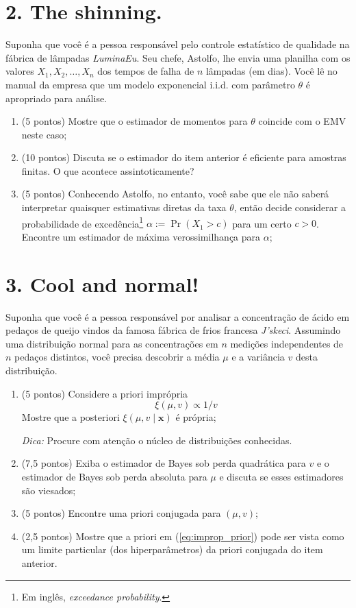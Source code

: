 \documentclass[a4paper,10pt, notitlepage]{report}
\newcommand{\pr}{\operatorname{Pr}} %
\newcommand{\rs}{X_1, X_2, \ldots, X_n} %
\begin{document}
\newpage
\section*{2. The shinning.}

Suponha que você é a pessoa responsável pelo controle estatístico de qualidade na fábrica de lâmpadas \textit{LuminaEu}.
Seu chefe, Astolfo, lhe envia uma planilha com os valores $\rs$ dos tempos de falha de $n$ lâmpadas (em dias).
Você lê no manual da empresa que um modelo exponencial i.i.d. com parâmetro $\theta$ é apropriado para análise.

\begin{enumerate}[label=\alph*)]
 \item (5 pontos) Mostre que o estimador de momentos para $\theta$ coincide com o EMV neste caso;
 \item (10 pontos) Discuta se o estimador do item anterior é eficiente para amostras finitas.
 O que acontece assintoticamente?
 \item (5 pontos) Conhecendo Astolfo, no entanto, você sabe que ele não saberá interpretar quaisquer estimativas diretas da taxa $\theta$, então decide considerar a probabilidade de excedência\footnote{Em inglês, \textit{exceedance probability}.} $\alpha := \pr(X_1 > c)$ para um certo $c > 0$.
 Encontre um estimador de máxima verossimilhança para $\alpha$;
\end{enumerate}

\section*{3. Cool and normal!}

Suponha que você é a pessoa responsável por analisar a concentração de ácido em pedaços de queijo vindos da famosa fábrica de frios francesa \textit{J'skeci}.
Assumindo uma distribuição normal para as concentrações em $n$ medições independentes de $n$ pedaços distintos, você precisa descobrir a média $\mu$ e a variância $v$ desta distribuição.

\begin{enumerate}[label=\alph*)]
 \item (5 pontos) Considere a priori imprópria
 \begin{equation}
 \label{eq:improp_prior}
 \xi(\mu, v) \propto 1/v
 \end{equation}
 Mostre que a posteriori $\xi(\mu, v \mid \boldsymbol{x})$ é própria;
 
 \textit{Dica:} Procure com atenção o núcleo de distribuições conhecidas.
 \item (7,5 pontos) Exiba o estimador de Bayes sob perda quadrática para $v$ e o estimador de Bayes sob perda absoluta para $\mu$ e discuta se esses estimadores são viesados;
 \item (5 pontos) Encontre uma priori  conjugada para $(\mu, v)$;
 \item (2,5 pontos) Mostre que a priori em (\ref{eq:improp_prior}) pode ser vista como um limite particular (dos hiperparâmetros) da priori conjugada do item anterior.
\end{enumerate}
\end{document}
